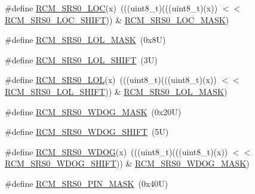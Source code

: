 \begin{DoxyCompactItemize}
\item 
\#define \mbox{\hyperlink{group___r_c_m___register___masks_ga7bf82026e976cd65600f81bd5438e475}{R\+C\+M\+\_\+\+S\+R\+S0\+\_\+\+L\+OC}}(x)~(((uint8\+\_\+t)(((uint8\+\_\+t)(x)) $<$$<$ \mbox{\hyperlink{group___r_c_m___register___masks_ga87c1e113b052d6c10c450973efa74eb7}{R\+C\+M\+\_\+\+S\+R\+S0\+\_\+\+L\+O\+C\+\_\+\+S\+H\+I\+FT}})) \& \mbox{\hyperlink{group___r_c_m___register___masks_ga0983314adae781518e2481ae518e14d8}{R\+C\+M\+\_\+\+S\+R\+S0\+\_\+\+L\+O\+C\+\_\+\+M\+A\+SK}})
\item 
\#define \mbox{\hyperlink{group___r_c_m___register___masks_ga0db6908ad880d9f7fd190fbb6922adda}{R\+C\+M\+\_\+\+S\+R\+S0\+\_\+\+L\+O\+L\+\_\+\+M\+A\+SK}}~(0x8\+U)
\item 
\#define \mbox{\hyperlink{group___r_c_m___register___masks_ga95ccd3811dd00bd56b397939db9b248d}{R\+C\+M\+\_\+\+S\+R\+S0\+\_\+\+L\+O\+L\+\_\+\+S\+H\+I\+FT}}~(3\+U)
\item 
\#define \mbox{\hyperlink{group___r_c_m___register___masks_gaa06c5b61ce671af9b09387f301701df0}{R\+C\+M\+\_\+\+S\+R\+S0\+\_\+\+L\+OL}}(x)~(((uint8\+\_\+t)(((uint8\+\_\+t)(x)) $<$$<$ \mbox{\hyperlink{group___r_c_m___register___masks_ga95ccd3811dd00bd56b397939db9b248d}{R\+C\+M\+\_\+\+S\+R\+S0\+\_\+\+L\+O\+L\+\_\+\+S\+H\+I\+FT}})) \& \mbox{\hyperlink{group___r_c_m___register___masks_ga0db6908ad880d9f7fd190fbb6922adda}{R\+C\+M\+\_\+\+S\+R\+S0\+\_\+\+L\+O\+L\+\_\+\+M\+A\+SK}})
\item 
\#define \mbox{\hyperlink{group___r_c_m___register___masks_gad203634bcb298bf54a3d5cce5c378a7e}{R\+C\+M\+\_\+\+S\+R\+S0\+\_\+\+W\+D\+O\+G\+\_\+\+M\+A\+SK}}~(0x20\+U)
\item 
\#define \mbox{\hyperlink{group___r_c_m___register___masks_gac989a90d61cdfb7e612c212a3f6d06d8}{R\+C\+M\+\_\+\+S\+R\+S0\+\_\+\+W\+D\+O\+G\+\_\+\+S\+H\+I\+FT}}~(5\+U)
\item 
\#define \mbox{\hyperlink{group___r_c_m___register___masks_ga3fcc4adf18ac9fce24a75a51e11853b2}{R\+C\+M\+\_\+\+S\+R\+S0\+\_\+\+W\+D\+OG}}(x)~(((uint8\+\_\+t)(((uint8\+\_\+t)(x)) $<$$<$ \mbox{\hyperlink{group___r_c_m___register___masks_gac989a90d61cdfb7e612c212a3f6d06d8}{R\+C\+M\+\_\+\+S\+R\+S0\+\_\+\+W\+D\+O\+G\+\_\+\+S\+H\+I\+FT}})) \& \mbox{\hyperlink{group___r_c_m___register___masks_gad203634bcb298bf54a3d5cce5c378a7e}{R\+C\+M\+\_\+\+S\+R\+S0\+\_\+\+W\+D\+O\+G\+\_\+\+M\+A\+SK}})
\item 
\#define \mbox{\hyperlink{group___r_c_m___register___masks_gab94707d2e91618c8c803dfa2d8df4e7b}{R\+C\+M\+\_\+\+S\+R\+S0\+\_\+\+P\+I\+N\+\_\+\+M\+A\+SK}}~(0x40\+U)
$$
\end{DoxyCompactItemize}
